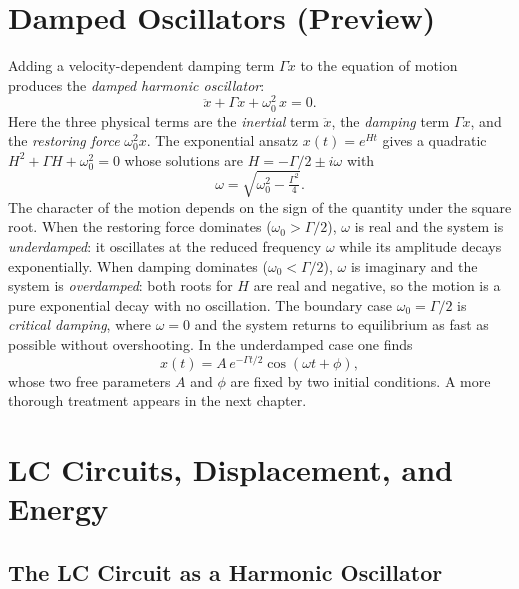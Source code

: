 \section{Damped Oscillators (Preview)}
Adding a velocity-dependent damping term $\Gamma\dot{x}$ to the equation of motion produces the \emph{damped harmonic oscillator}:
\begin{equation}
    \ddot{x} + \Gamma\dot{x} + \omega_0^2\,x = 0.
\end{equation}
Here the three physical terms are the \emph{inertial} term $\ddot{x}$, the \emph{damping} term $\Gamma\dot{x}$, and the \emph{restoring force} $\omega_0^2 x$. The exponential ansatz $x(t) = e^{Ht}$ gives a quadratic $H^2 + \Gamma H + \omega_0^2 = 0$ whose solutions are $H = -\Gamma/2 \pm i\omega$ with
\begin{equation}
    \omega = \sqrt{\omega_0^2 - \tfrac{\Gamma^2}{4}}.
\end{equation}
The character of the motion depends on the sign of the quantity under the square root. When the restoring force dominates ($\omega_0 > \Gamma/2$), $\omega$ is real and the system is \emph{underdamped}: it oscillates at the reduced frequency $\omega$ while its amplitude decays exponentially. When damping dominates ($\omega_0 < \Gamma/2$), $\omega$ is imaginary and the system is \emph{overdamped}: both roots for $H$ are real and negative, so the motion is a pure exponential decay with no oscillation. The boundary case $\omega_0 = \Gamma/2$ is \emph{critical damping}, where $\omega = 0$ and the system returns to equilibrium as fast as possible without overshooting. In the underdamped case one finds
\begin{equation}
    x(t) = A\,e^{-\Gamma t / 2}\cos(\omega t + \phi),
\end{equation}
whose two free parameters $A$ and $\phi$ are fixed by two initial conditions. A more thorough treatment appears in the next chapter.

\section{LC Circuits, Displacement, and Energy}

\subsection{The LC Circuit as a Harmonic Oscillator}

